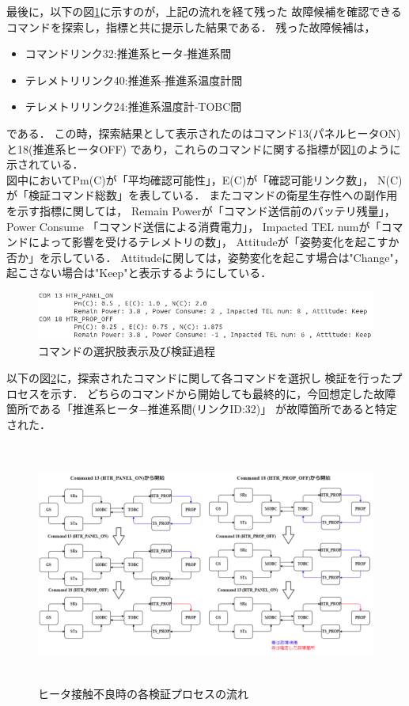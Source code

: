 \documentclass[11pt]{jsreport}
\begin{document}
最後に，以下の図\ref{fig:COM_candidate}に示すのが，上記の流れを経て残った
故障候補を確認できるコマンドを探索し，指標と共に提示した結果である．
残った故障候補は，
\begin{itemize}
   \item コマンドリンク32:推進系ヒータ‐推進系間
   \item テレメトリリンク40:推進系‐推進系温度計間
   \item テレメトリリンク24:推進系温度計‐TOBC間   
\end{itemize}
である．
この時，探索結果として表示されたのはコマンド13(パネルヒータON)と18(推進系ヒータOFF)
であり，これらのコマンドに関する指標が図\ref{fig:COM_candidate}のように示されている．\\
図中においてPm(C)が「平均確認可能性」，E(C)が「確認可能リンク数」，
N(C)が「検証コマンド総数」を表している．
またコマンドの衛星生存性への副作用を示す指標に関しては，
Remain Powerが「コマンド送信前のバッテリ残量」，Power Consume
「コマンド送信による消費電力」，
Impacted TEL numが「コマンドによって影響を受けるテレメトリの数」，
Attitudeが「姿勢変化を起こすか否か」を示している．
Attitudeに関しては，姿勢変化を起こす場合は"Change"，起こさない場合は"Keep"と表示するようにしている．

\begin{figure}[H]
   \centering
      \includegraphics[width=15.0cm]{figure/COM_candidate.png}
      \caption{コマンドの選択肢表示及び検証過程}
      \label{fig:COM_candidate}
\end{figure}
以下の図\ref{fig:COM_process_HTR_fault}に，探索されたコマンドに関して各コマンドを選択し
検証を行ったプロセスを示す．
どちらのコマンドから開始しても最終的に，今回想定した故障箇所である「推進系ヒータ−推進系間(リンクID:32)」
が故障箇所であると特定された．

\begin{figure}[H]
   \centering
      \includegraphics[height=8.0cm]{figure/COM_process_HTR_PROP_fault.png}
      \caption{ヒータ接触不良時の各検証プロセスの流れ}
      \label{fig:COM_process_HTR_fault}
\end{figure}
\end{document}
